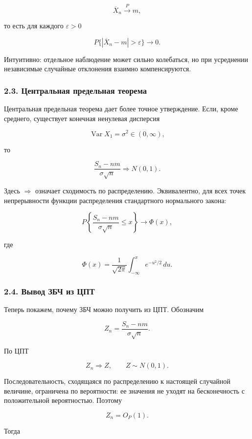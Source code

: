 \documentclass[
  11pt,
  a4paper,
]{article}
\begin{document}
\[
\overline X_n\xrightarrow{P}m,
\]

то есть для каждого \(\varepsilon>0\)

\[
P\{|\overline X_n-m|>\varepsilon\}\to0.
\]

Интуитивно: отдельное наблюдение может сильно колебаться, но при
усреднении независимые случайные отклонения взаимно компенсируются.

\subsubsection{2.3. Центральная предельная
теорема}\label{ux446ux435ux43dux442ux440ux430ux43bux44cux43dux430ux44f-ux43fux440ux435ux434ux435ux43bux44cux43dux430ux44f-ux442ux435ux43eux440ux435ux43cux430}

Центральная предельная теорема дает более точное утверждение. Если,
кроме среднего, существует конечная ненулевая дисперсия

\[
\operatorname{Var}X_1=\sigma^2\in(0,\infty),
\]

то

\[
\frac{S_n-nm}{\sigma\sqrt n}
\Rightarrow
N(0,1).
\]

Здесь \(\Rightarrow\) означает сходимость по распределению.
Эквивалентно, для всех точек непрерывности функции распределения
стандартного нормального закона:

\[
P\left\{
\frac{S_n-nm}{\sigma\sqrt n}\le x
\right\}
\to
\Phi(x),
\]

где

\[
\Phi(x)=\frac{1}{\sqrt{2\pi}}\int_{-\infty}^x e^{-u^2/2}\,du.
\]

\subsubsection{2.4. Вывод ЗБЧ из
ЦПТ}\label{ux432ux44bux432ux43eux434-ux437ux431ux447-ux438ux437-ux446ux43fux442}

Теперь покажем, почему ЗБЧ можно получить из ЦПТ. Обозначим

\[
Z_n=
\frac{S_n-nm}{\sigma\sqrt n}.
\]

По ЦПТ

\[
Z_n\Rightarrow Z,
\qquad
Z\sim N(0,1).
\]

Последовательность, сходящаяся по распределению к настоящей случайной
величине, ограничена по вероятности: ее значения не уходят на
бесконечность с положительной вероятностью. Поэтому

\[
Z_n=O_P(1).
\]

Тогда
\end{document}
